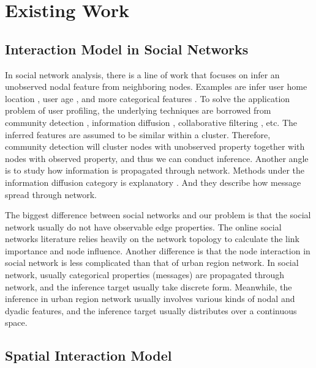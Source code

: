 \section{Existing Work}
\label{sec:ew}



\subsection{Interaction Model in Social Networks}


In social network analysis, there is a line of work that focuses on infer an unobserved  nodal feature from neighboring nodes. Examples are infer user home location \cite{Pontes:2012:WKY:2370216.2370419, Li:2012:TSU:2339530.2339692}, user age \cite{6195711}, and more categorical features \cite{Mislove:2010:YYK:1718487.1718519}. To solve the application problem of user profiling, the underlying techniques are borrowed from community detection \cite{fortunato2010community}, information diffusion \cite{guille2013information}, collaborative filtering \cite{breese1998empirical}, etc. The inferred features are assumed to be similar within a cluster. Therefore, community detection will cluster nodes with unobserved property together with nodes with observed property, and thus we can conduct inference. Another angle is to study how information is propagated through network. Methods under the information diffusion category is explanatory \cite{rodriguez2011uncovering, gomez2010inferring}. And they describe how message spread through network. 


The biggest difference between social networks and our problem is that the social network usually do not have observable edge properties. The online social networks literature relies heavily on the network topology to calculate the link importance and node influence. Another difference is that the node interaction in social network is less complicated than that of urban region network. In social network, usually categorical  properties (messages) are propagated through network, and the inference target usually take discrete form. Meanwhile, the inference in urban region network usually involves various kinds of nodal and dyadic features, and the inference target usually distributes over a continuous space.




\subsection{Spatial Interaction Model}


